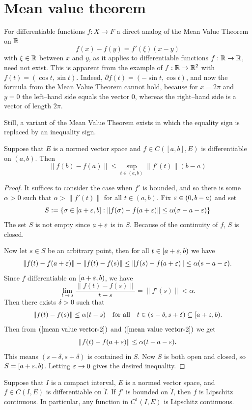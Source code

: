 \section{Mean value theorem}
For differentiable functions $f:X\to F$ a direct analog of the Mean Value Theorem on $\mathbb{R}$
\[f(x)-f(y)=f'(\xi)(x-y)\]
with $\xi\in\mathbb{R}$ between $x$ and $y$, as it applies to differentiable functions $f:\mathbb{R}\to\mathbb{R}$, need not exist. This is apparent from the example of $f:\mathbb{R}\to\mathbb{R}^2$ with 
$f(t)=(\cos t,\sin t)$. Indeed, $\partial f(t)=(-\sin t,\cos t)$, and now the formula from the Mean Value Theorem cannot hold, because for $x=2\pi$ and $y=0$ 
the left–hand side equals the vector $0$, whereas the right–hand side is a vector of length $2\pi$.\par
Still, a variant of the Mean Value Theorem exists in which the equality sign is replaced by an inequality sign.
\begin{theorem}
Suppose that $E$ is a normed vector space and $f\in C([a,b],E)$ is differentiable on $(a,b)$. Then
\[\|f(b)-f(a)\|\leq\sup_{t\in(a,b)}\|f'(t)\|(b-a)\]
\end{theorem}
\begin{proof}
It suffices to consider the case when $f'$ is bounded, and so there is some $\alpha>0$ such that $\alpha>\|f'(t)\|$ for all $t\in(a,b)$. Fix $\varepsilon\in(0,b-a)$ and set
\[S:=\{\sigma\in[a+\varepsilon,b]:\|f(\sigma)-f(a+\varepsilon)\|\leq\alpha(\sigma-a-\varepsilon)\}\]
The set $S$ is not empty since $a+\varepsilon$ is in $S$. Because of the continuity of $f$, $S$ is closed.\par
Now let $s\in S$ be an arbitrary point, then for all $t\in[a+\varepsilon,b)$ we have
\begin{align}\label{mean value vector-1}
\|f(t)-f(a+\varepsilon)\|-\|f(t)-f(s)\|\leq\|f(s)-f(a+\varepsilon)\|\leq\alpha(s-a-\varepsilon).
\end{align}
Since $f$ differentiable on $[a+\varepsilon,b)$, we have
\[\lim_{t\to s}\frac{\|f(t)-f(s)\|}{t-s}=\|f'(s)\|<\alpha.\]
Then there exists $\delta>0$ such that
\begin{align}\label{mean value vector-2}
\|f(t)-f(s)\|\leq\alpha(t-s)\quad\text{for all}\quad t\in(s-\delta,s+\delta)\subseteq[a+\varepsilon,b).
\end{align}
Then from $(\ref{mean value vector-2})$ and $(\ref{mean value vector-2})$ we get
\[\|f(t)-f(a+\varepsilon)\|\leq\alpha(t-a-\varepsilon).\]
This means $(s-\delta,s+\delta)$ is contained in $S$. Now $S$ is both open and closed, so $S=[a+\varepsilon,b)$. Letting $\varepsilon\to0$ gives the desired inequality.
\end{proof}
\begin{corollary}
Suppose that $I$ is a compact interval, $E$ is a normed vector space, and $f\in C(I,E)$ is differentiable on $\mathring{I}$. If $f'$ is bounded on $\mathring{I}$, then $f$ is Lipschitz continuous. In particular, any function in $C^1(I,E)$ is Lipschitz continuous.
\end{corollary}
